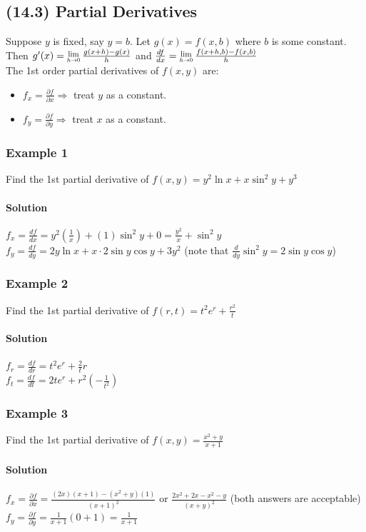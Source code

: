 \documentclass{article}
\newcommand{\Lim}[1]{\raisebox{0.5ex}{\scalebox{0.8}{$\displaystyle \lim_{#1}\;$}}}
\newcommand{\p}{\partial}
\begin{document}
\subsection{(14.3) Partial Derivatives}
Suppose $y$ is fixed, say $y=b$. Let $g(x)=f(x,b)$ where $b$ is some constant.
Then $g'(x)=\Lim{h\to0}\frac{g(x+h)-g(x)}{h}$ and $\frac{df}{dx}=\Lim{h\to0}\frac{f(x+h,b)-f(x,b)}{h}$
\\The 1st order partial derivatives of $f(x,y)$ are: \begin{itemize}
    \itemsep 0em
    \item $f_x=\frac{\p f}{\p x}\Rightarrow$ treat $y$ as a constant.
    \item $f_y=\frac{\p f}{\p y}\Rightarrow$ treat $x$ as a constant.
\end{itemize}

\subsubsection{Example 1}
Find the 1st partial derivative of $f(x,y)=y^2\ln{x}+x\sin^2y+y^3$
\paragraph{Solution} $f_x=\frac{df}{dx}=y^2(\frac{1}{x})+(1)\sin^2y+0=\frac{y^2}{x}+\sin^2y$
\\$f_y=\frac{df}{dy}=2y\ln{x}+x\cdot2\sin{y}\cos{y}+3y^2$ (note that $\frac{d}{dy}\sin^2y=2\sin{y}\cos{y}$)

\newpage\subsubsection{Example 2}
Find the 1st partial derivative of $f(r,t)=t^2e^r+\frac{r^2}{t}$
\paragraph{Solution} $f_r=\frac{df}{dr}=t^2e^r+\frac{2}{t}r$
\\$f_t=\frac{df}{dt}=2te^r+r^2(-\frac{1}{t^2})$

\subsubsection{Example 3}
Find the 1st partial derivative of $f(x,y)=\frac{x^2+y}{x+1}$
\paragraph{Solution} $f_x=\frac{\p f}{\p x}=\frac{(2x)(x+1)-(x^2+y)(1)}{(x+1)^2}$
or $\frac{2x^2+2x-x^2-y}{(x+y)^2}$ (both answers are acceptable)
\\$f_y=\frac{\p f}{\p y}=\frac{1}{x+1}(0+1)=\frac{1}{x+1}$
\end{document}
